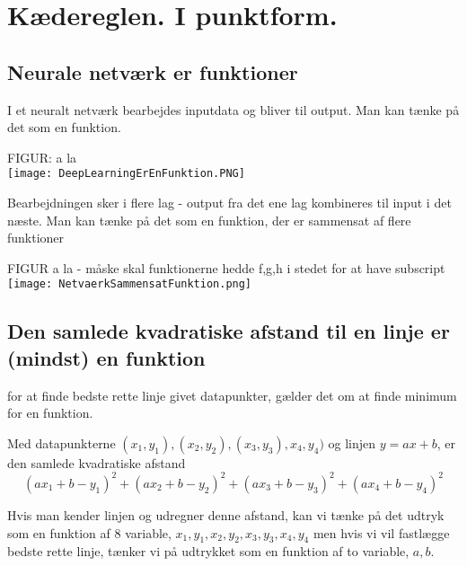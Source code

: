 \documentclass[a4paper, 12pt]{article}
\theoremstyle{remark}
\newtheorem{Eksempel}{\textbf{Eksempel}}
\begin{document}
\section*{Kædereglen. I punktform.}
\subsection*{Neurale netværk er funktioner}  I et neuralt netværk bearbejdes inputdata og bliver til output. Man kan tænke på det som en funktion. 


FIGUR: a la \\
\texttt{[image: DeepLearningErEnFunktion.PNG]}


Bearbejdningen sker  i flere lag - output fra det ene lag kombineres til input i det næste. Man kan tænke på det som en funktion, der er sammensat af flere funktioner 


FIGUR a la - måske skal funktionerne hedde f,g,h i stedet for at have subscript \\
\texttt{[image: NetvaerkSammensatFunktion.png]}

\subsection*{Den samlede kvadratiske afstand til en linje er (mindst) en funktion}
for at finde bedste rette linje givet datapunkter, gælder det om at finde minimum for en funktion.

Med datapunkterne $(x_1,y_1), (x_2,y_2), (x_3,y_3), x_4,y_4)$ og linjen $y=ax +b$, er den samlede kvadratiske afstand
$$(ax_1+b - y_1)^2+(ax_2+b - y_2)^2+(ax_3+b - y_3)^2+(ax_4+b - y_4)^2$$

Hvis man kender linjen og udregner denne afstand, kan vi tænke på det udtryk som en funktion af 8 variable, $x_1,y_1, x_2,y_2, x_3,y_3, x_4,y_4$ men hvis vi vil fastlægge bedste rette linje, tænker vi på udtrykket som en funktion af to variable, $a,b$.


%
\end{document}
